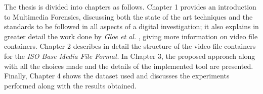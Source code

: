 The thesis is divided into chapters as follows. Chapter 1 provides an introduction to Multimedia Forensics, discussing both the state of the art techniques and the standards to be followed in all aspects of a digital investigation; it also explains in greater detail the work done by \emph{Gloe et al.} \cite{Gloe2014S68}, giving more information on video file containers. Chapter 2 describes in detail the structure of the video file containers for the \emph{ISO Base Media File Format}. In Chapter 3, the proposed approach along with all the choices made and the details of the implemented tool are presented. Finally, Chapter 4 shows the dataset used and discusses the experiments performed along with the results obtained.